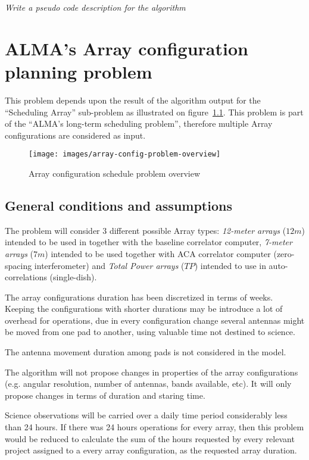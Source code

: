 \textit{Write a pseudo code description for the algorithm}

\chapter{ALMA's Array configuration planning problem}
\label{sec:array-config-plan}
This problem depends upon the result of the algorithm output for the ``Scheduling Array'' sub-problem as illustrated on figure~\ref{fig:array-config-problem-overview}. This problem is part of the ``ALMA's  long-term scheduling problem'', therefore multiple Array configurations are considered as input.
\begin{figure}[h!]
\begin{center}
\texttt{[image: images/array-config-problem-overview]}
\end{center}
\caption{Array configuration schedule problem overview}
\label{fig:array-config-problem-overview}
\end{figure}

\section{General conditions and assumptions}
\label{sec:array-problem-general-condition}
The problem will consider 3 different possible Array types: \textit{12-meter arrays} ($12m$) intended to be used in together with the baseline correlator computer, \textit{7-meter arrays} ($7m$) intended to be used together with ACA correlator computer (zero-spacing interferometer) and \textit{Total Power arrays} ($TP$) intended to use in auto-correlations (single-dish). 

The array configurations duration has been discretized in terms of weeks. Keeping the configurations with shorter durations may be introduce a lot of overhead for operations, due in every configuration change several antennas might be moved from one pad to another, using valuable time not destined to science.

The antenna movement duration among pads is not considered in the model.

The algorithm will not propose changes in properties of the array configurations (e.g. angular resolution, number of antennas, bands available, etc). It will only propose changes in terms of duration and staring time.

Science observations will be carried over a daily time period considerably less than 24 hours. If there was 24 hours operations for every array, then this problem would be reduced to calculate the sum of the hours requested by every relevant project assigned to a every array configuration, as the requested array duration.

